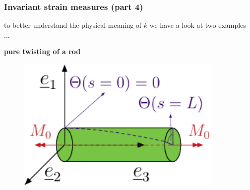 \begin{frame}
  \frametitle{Invariant strain measures (part 4)}

  to better understand the physical meaning of $\underline{k}$ we have a look at two examples ...
  
  \vspace{0.5em}
  \textbf{pure twisting of a rod}
  \vspace{-1em}
  \begin{multicols}{2}
    \noindent
    
    \begin{figure}
      \centering
      \includegraphics[width=10cm, keepaspectratio=true]{sections/cosserat_rods/images/PureTwistingExample}
    \end{figure}


\end{multicols}
\end{frame}
